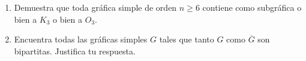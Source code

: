 \begin{enumerate}
    \item Demuestra que toda gráfica simple de orden $n \ge 6$ contiene como
    subgráfica o bien a $K_3$ o bien a $O_3$.
    
    \item Encuentra todas las gráficas simples $G$ tales que tanto $G$ como
    $\overline{G}$ son bipartitas. Justifica tu respuesta.
    
  \end{enumerate}